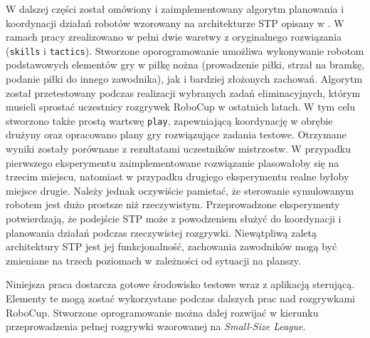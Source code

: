 W dalszej części został omówiony i zaimplementowany algorytm planowania i koordynacji działań robotów wzorowany na architekturze STP opisany w \cite{stp}. W ramach pracy zrealizowano w pełni dwie
warstwy z oryginalnego rozwiązania (\texttt{skills} i \texttt{tactics}). Stworzone oporogramowanie umożliwa wykonywanie robotom podstawowych elementów gry w piłkę nożna (prowadzenie piłki, strzał na bramkę,
podanie piłki do innego zawodnika), jak i bardziej złożonych zachowań. Algorytm został przetestowany podczas realizacji wybranych zadań eliminacyjnych,
którym musieli sprostać uczestnicy rozgrywek RoboCup w ostatnich latach. W tym celu stworzono także prostą wartswę \texttt{play}, zapewniającą koordynację w obrębie drużyny
oraz opracowano plany gry rozwiązujące zadania testowe. Otrzymane wyniki zostały porównane z rezultatami uczestników mistrzostw. W przypadku pierwszego eksperymentu zaimplementowane
rozwiązanie plasowałoby się na trzecim miejscu, natomiast w przypadku drugiego eksperymentu realne byłoby miejsce drugie. Należy jednak oczywiście pamietać, że sterowanie symulowanym
robotem jest dużo prostsze niż rzeczywistym. Przeprowadzone eksperymenty potwierdzają, że podejście STP może z powodzeniem służyć do koordynacji i planowania działań podczas rzeczywistej rozgrywki.
Niewątpliwą zaletą architektury STP jest jej funkcjonalność, zachowania zawodników mogą być zmieniane na trzech poziomach w zależności od sytuacji na planszy.

Niniejsza praca dostarcza gotowe środowisko testowe wraz z aplikacją sterującą. Elementy te mogą zostać wykorzystane podczas dalszych prac nad rozgrywkami RoboCup. Stworzone oprogramowanie można
dalej rozwijać w kierunku przeprowadzenia pełnej rozgrywki wzorowanej na  \emph{Small-Size League}.
